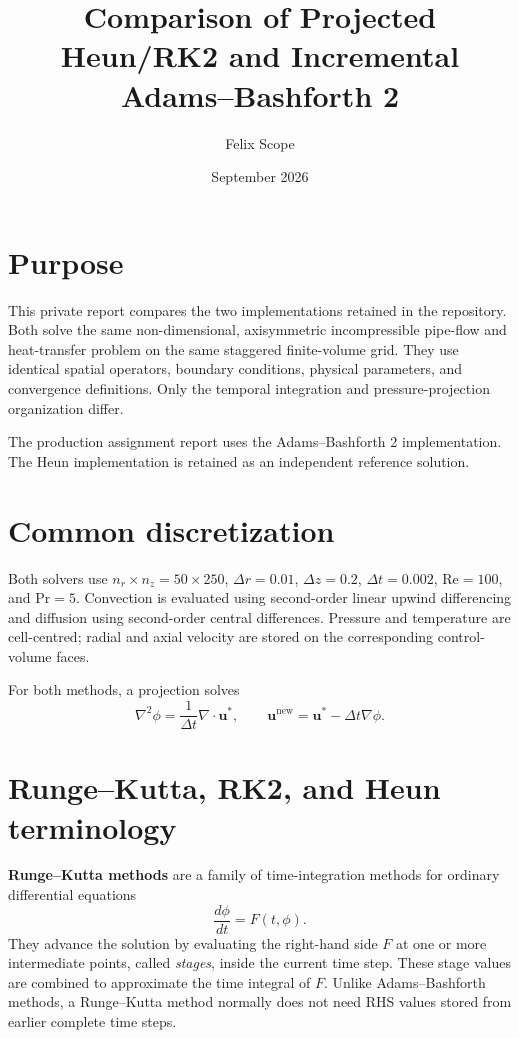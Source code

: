 \documentclass[11pt,a4paper]{article}
\title{Comparison of Projected Heun/RK2 and Incremental Adams--Bashforth 2}
\author{Felix Scope}
\date{September 2026}
\begin{document}
\maketitle

\section{Purpose}

This private report compares the two implementations retained in the
repository. Both solve the same non-dimensional, axisymmetric incompressible
pipe-flow and heat-transfer problem on the same staggered finite-volume grid.
They use identical spatial operators, boundary conditions, physical
parameters, and convergence definitions. Only the temporal integration and
pressure-projection organization differ.

The production assignment report uses the Adams--Bashforth 2 implementation.
The Heun implementation is retained as an independent reference solution.

\section{Common discretization}

Both solvers use $n_r\times n_z=50\times250$, $\Delta r=0.01$,
$\Delta z=0.2$, $\Delta t=0.002$, $\mathrm{Re}=100$, and
$\mathrm{Pr}=5$. Convection is evaluated using second-order linear upwind
differencing and diffusion using second-order central differences. Pressure
and temperature are cell-centred; radial and axial velocity are stored on the
corresponding control-volume faces.

For both methods, a projection solves
\begin{equation}
 \nabla^2\phi=\frac{1}{\Delta t}\nabla\cdot\bm{u}^{*},
 \qquad
 \bm{u}^{\mathrm{new}}=\bm{u}^{*}-\Delta t\nabla\phi.
\end{equation}

\section{Runge--Kutta, RK2, and Heun terminology}

\textbf{Runge--Kutta methods} are a family of time-integration methods for
ordinary differential equations
\begin{equation}
 \frac{d\phi}{dt}=F(t,\phi).
\end{equation}
They advance the solution by evaluating the right-hand side $F$ at one or
more intermediate points, called \emph{stages}, inside the current time step.
These stage values are combined to approximate the time integral of $F$.
Unlike Adams--Bashforth methods, a Runge--Kutta method normally does not need
RHS values stored from earlier complete time steps.
\end{document}
